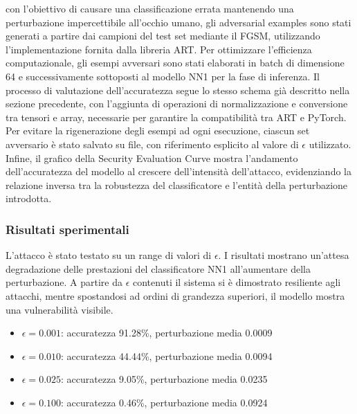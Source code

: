             \noindent con l'obiettivo di causare una classificazione errata mantenendo una perturbazione impercettibile all'occhio umano, gli adversarial examples sono stati generati a partire dai campioni del test set mediante il FGSM, utilizzando l’implementazione fornita dalla libreria ART. Per ottimizzare l’efficienza computazionale, gli esempi avversari sono stati elaborati in batch di dimensione 64 e successivamente sottoposti al modello NN1 per la fase di inferenza.
            Il processo di valutazione dell’accuratezza segue lo stesso schema già descritto nella sezione precedente, con l’aggiunta di operazioni di normalizzazione e conversione tra tensori e array, necessarie per garantire la compatibilità tra ART e PyTorch.
            Per evitare la rigenerazione degli esempi ad ogni esecuzione, ciascun set avversario è stato salvato su file, con riferimento esplicito al valore di $\epsilon$ utilizzato.
            Infine, il grafico della Security Evaluation Curve mostra l’andamento dell’accuratezza del modello al crescere dell’intensità dell’attacco, evidenziando la relazione inversa tra la robustezza del classificatore e l’entità della perturbazione introdotta.

            \subsubsection*{Risultati sperimentali}
                \noindent L'attacco è stato testato su un range di valori di $\epsilon$. I risultati mostrano un'attesa degradazione delle prestazioni del classificatore NN1 all'aumentare della perturbazione. A partire da $\epsilon$ contenuti il sistema si è dimostrato resiliente agli attacchi, mentre spostandosi ad ordini di grandezza superiori, il modello mostra una vulnerabilità visibile.

                    \begin{itemize}
                        \item $\epsilon = 0.001$: accuratezza 91.28\%, perturbazione media 0.0009
                        
                        \item $\epsilon = 0.010$: accuratezza 44.44\%, perturbazione media 0.0094
                        
                        \item $\epsilon = 0.025$: accuratezza 9.05\%, perturbazione media 0.0235
                        
                        \item $\epsilon = 0.100$: accuratezza 0.46\%, perturbazione media 0.0924
                    \end{itemize}

